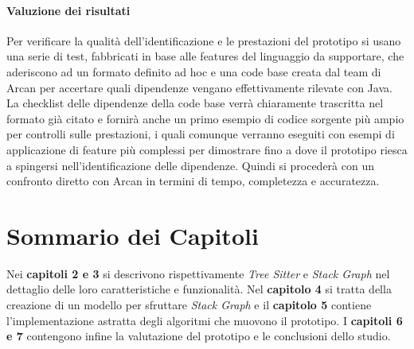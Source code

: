 \paragraph{Valuzione dei risultati}

Per verificare la qualit\`a dell'identificazione e le prestazioni del prototipo si usano una serie di test, fabbricati in base alle features del linguaggio da supportare, che aderiscono ad un formato definito ad hoc e una code base creata dal team di Arcan per accertare quali dipendenze vengano effettivamente rilevate con Java. La checklist delle dipendenze della code base verr\`a chiaramente trascritta nel formato gi\`a citato e fornir\`a anche un primo esempio di codice sorgente pi\`u ampio per controlli sulle prestazioni, i quali comunque verranno eseguiti con esempi di applicazione di feature pi\`u complessi per dimostrare fino a dove il prototipo riesca a spingersi nell'identificazione delle dipendenze. Quindi si proceder\`a con un confronto diretto con Arcan in termini di tempo, completezza e accuratezza.

\section{Sommario dei Capitoli}

Nei \textbf{capitoli 2 e 3} si descrivono rispettivamente \emph{Tree Sitter} e \emph{Stack Graph} nel dettaglio delle loro caratteristiche e funzionalit\`a. Nel \textbf{capitolo 4} si tratta della creazione di un modello per sfruttare \emph{Stack Graph} e il \textbf{capitolo 5} contiene l'implementazione astratta degli algoritmi che muovono il prototipo. I \textbf{capitoli 6 e 7} contengono infine la valutazione del prototipo e le conclusioni dello studio.
